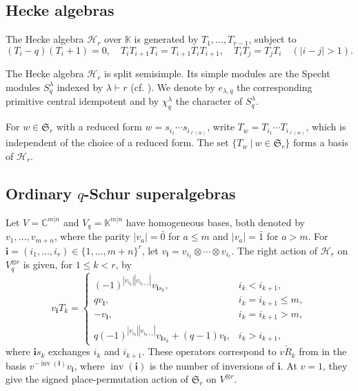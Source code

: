 \documentclass[11pt]{amsart}
\numberwithin{equation}{section}
\theoremstyle{plain}
\theoremstyle{definition}
\theoremstyle{remark}
\begin{document}
\subsection{Hecke algebras}

The Hecke algebra $\mathcal H_r$ over $\mathbb{K}$ is
generated by $T_1,\ldots,T_{r-1}$, subject to
\begin{equation}\label{rel:hecke}
(T_i-q)(T_i+1)=0, \quad T_iT_{i+1}T_i=T_{i+1}T_iT_{i+1},\quad
T_iT_j=T_jT_i \quad(|i-j|>1).
\end{equation}

The Hecke algebra $\mathcal H_r$ is split semisimple. Its
simple modules are the Specht modules $S_q^\lambda$ indexed by
$\lambda\vdash r$ (cf. \cite{DJ86}). We denote by $e_{\lambda,q}$
the corresponding primitive central idempotent and by
$\chi_q^\lambda$ the character of $S_q^\lambda$.

For $w\in\mathfrak S_r$ with a reduced form $w=s_{i_1}\cdots s_{i_{\ell(w)}}$, write
$T_w=T_{i_1}\cdots T_{i_{\ell(w)}}$, which is independent of the choice of a reduced form. The set $\{T_w~|~w\in\mathfrak S_r\}$ forms a basis of $\mathcal H_r$.


\subsection{Ordinary \texorpdfstring{$q$}{q}-Schur superalgebras}

Let $V=\mathbb C^{m|n}$ and $V_q=\mathbb{K}^{m|n}$ have homogeneous
bases, both denoted by $v_1,\ldots,v_{m+n}$, where the parity $|v_a|=\bar0$
for $a\leq m$ and $|v_a|=\bar1$ for $a>m$. For
$\mathbf i=(i_1,\ldots,i_r)\in\{1,\ldots,m+n\}^r$, let
$v_{\mathbf i}=v_{i_1}\otimes\cdots\otimes v_{i_r}$.
The right action of
$\mathcal H_r$ on $V_q^{\otimes r}$ is given, for $1\leq k<r$, by
\begin{equation}\label{eq:signed-q}
v_{\mathbf i}T_k=
\begin{cases}
(-1)^{|v_{i_k}||v_{i_{k+1}}|}
v_{\mathbf i s_k},
& i_k<i_{k+1},\\
qv_{\mathbf i},
& i_k=i_{k+1}\leq m,\\
-v_{\mathbf i},
& i_k=i_{k+1}>m,\\
q(-1)^{|v_{i_k}||v_{i_{k+1}}|}
v_{\mathbf i s_k}+(q-1)v_{\mathbf i},
& i_k>i_{k+1},
\end{cases}
\end{equation}
where $\mathbf i s_k$ exchanges $i_k$ and $i_{k+1}$.
These operators correspond to
$v\check R_k$ from \cite[(8.1.1), Lemma~8.2]{DR11} in the basis
$v^{-\operatorname{inv}(\mathbf i)}v_{\mathbf i}$, where
$\operatorname{inv}(\mathbf i)$ is the number of inversions of
$\mathbf i$. At $v=1$, they give the signed place-permutation
action of $\mathfrak S_r$ on $V^{\otimes r}$.
\end{document}
